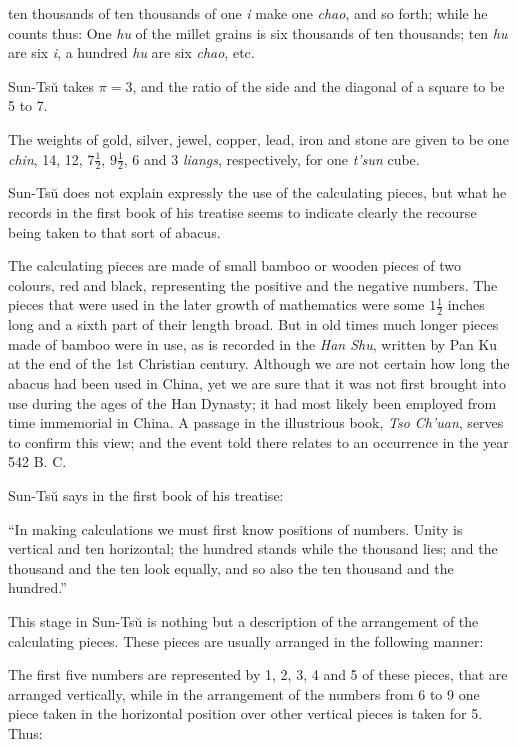 \documentclass[11pt]{article}
\newcommand{\scanpage}[2]{\clearpage\setcounter{footnote}{0}\noindent{\footnotesize\color{gray}PDF page #1 · #2}\par\medskip}
\begin{document}
\scanpage{0041}{Chapter 4, printed page 27}

ten thousands of ten thousands of one \emph{i} make one \emph{chao}, and so forth; while he counts thus: One \emph{hu} of the millet grains is six thousands of ten thousands; ten \emph{hu} are six \emph{i}, a hundred \emph{hu} are six \emph{chao}, etc.

Sun-Tsŭ takes $\pi=3$, and the ratio of the side and the diagonal of a square to be 5 to 7.

The weights of gold, silver, jewel, copper, lead, iron and stone are given to be one \emph{chin}, 14, 12, $7\frac{1}{2}$, $9\frac{1}{2}$, 6 and 3 \emph{liangs}, respectively, for one \emph{t'sun} cube.

Sun-Tsŭ does not explain expressly the use of the calculating pieces, but what he records in the first book of his treatise seems to indicate clearly the recourse being taken to that sort of abacus.

The calculating pieces are made of small bamboo or wooden pieces of two colours, red and black, representing the positive and the negative numbers. The pieces that were used in the later growth of mathematics were some $1\frac{1}{2}$ inches long and a sixth part of their length broad. But in old times much longer pieces made of bamboo were in use, as is recorded in the \emph{Han Shu}, written by Pan Ku at the end of the 1st Christian century. Although we are not certain how long the abacus had been used in China, yet we are sure that it was not first brought into use during the ages of the Han Dynasty; it had most likely been employed from time immemorial in China. A passage in the illustrious book, \emph{Tso Ch'uan}, serves to confirm this view; and the event told there relates to an occurrence in the year 542 B. C.

Sun-Tsŭ says in the first book of his treatise:

``In making calculations we must first know positions of numbers. Unity is vertical and ten horizontal; the hundred stands while the thousand lies; and the thousand and the ten look equally, and so also the ten thousand and the hundred.''

This stage in Sun-Tsŭ is nothing but a description of the arrangement of the calculating pieces. These pieces are usually arranged in the following manner:

The first five numbers are represented by 1, 2, 3, 4 and 5 of these pieces, that are arranged vertically, while in the arrangement of the numbers from 6 to 9 one piece taken in the horizontal position over other vertical pieces is taken for 5. Thus:
\end{document}

